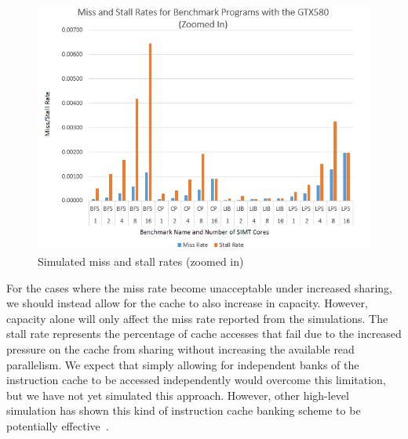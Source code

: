 \begin{figure}
\centering
\includegraphics[width=\columnwidth]{graphics/miss_stalls_benchmarks_zoomed.png}
\caption{Simulated miss and stall rates (zoomed in) }
\label{fig:missStallsZoomed}
\end{figure}

For the cases where the miss rate become unacceptable under increased
sharing, we should instead allow for the cache to also increase in
capacity. 
However, capacity alone will only affect the miss rate reported from
the simulations.
The stall rate represents the percentage of cache accesses that fail
due to the increased pressure on the cache from sharing without
increasing the available read parallelism.
We expect that simply allowing for independent banks of the
instruction cache to be accessed independently would overcome this
limitation, but we have not yet simulated this approach.
However, other high-level simulation has shown this kind of
instruction cache banking scheme to be potentially
effective~\cite{kopta10}. 




